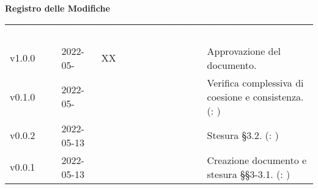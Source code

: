 

{\LARGE{\textbf{Registro delle Modifiche}}} \\
\begin{table}[!htbp]
\renewcommand{\arraystretch}{1.5}
\begin{tabular}{ m{}<{\centering}  m{}<{\centering}  m{}<{\centering}  m{}<{\centering}  m{}<{\centering} }
	\rowcolor{darkblue}
	\textcolor{white}{\textbf{Versione}} &\textcolor{white}{\textbf{Data}}& \textcolor{white}{\textbf{Nominativo}} & \textcolor{white}{\textbf{Ruolo}}&\textcolor{white}{\textbf{Descrizione}}\\ 

	v1.0.0 & 2022-05- & XX & \RE & Approvazione del documento. \\

	v0.1.0& 2022-05- & \FP & \AN & Verifica complessiva di coesione e consistenza.  (\VE: \textit{})\\

	v0.0.2& 2022-05-13 & \FP & \AN & Stesura \S{3.2}.  (\VE: \textit{})\\

	v0.0.1& 2022-05-13 & \GC & \AN & Creazione documento e stesura \S\S{3-3.1}.  (\VE: \textit{})\\

\end{tabular}
\end{table}

\pagebreak